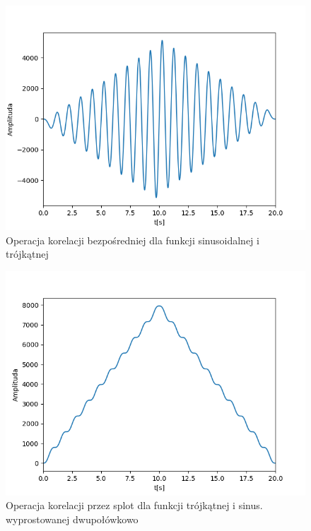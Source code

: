 \documentclass[12pt]{article}
\begin{document}
\begin{figure}[H]
\centering
\includegraphics[scale=0.6]{korelacjaTrojkatSinus.png}
\caption{Operacja korelacji bezpośredniej dla funkcji sinusoidalnej i trójkątnej}
\end{figure}

\begin{figure}[H]
\centering
\includegraphics[scale=0.6]{korelacjaSplotTrojkatDwupolowkowy.png}
\caption{Operacja korelacji przez splot dla funkcji trójkątnej i sinus. wyprostowanej dwupołówkowo}
\end{figure}
\end{document}
